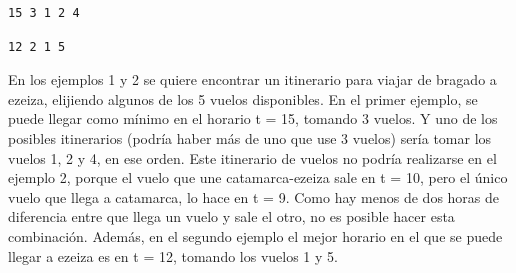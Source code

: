 \documentclass[11pt, a4paper, twoside]{article}
\begin{document}
\begin{minipage}[t]{0.4\textwidth}
\begin{Verbatim}[frame=single,framesep=1cm,label= Salida para instancia 1]
15 3 1 2 4
\end{Verbatim}
\end{minipage}
\hfill
\begin{minipage}[t]{0.4\textwidth}
\begin{Verbatim}[frame=single,framesep=1cm,label= Salida para instancia 2]
12 2 1 5
\end{Verbatim}
\end{minipage}

En los ejemplos 1 y 2 se quiere encontrar un itinerario para viajar de bragado a 
ezeiza, elijiendo algunos de los 5 vuelos disponibles. En el primer ejemplo, se 
puede llegar como mínimo en el horario t = 15, tomando 3 vuelos. Y uno de los
posibles itinerarios (podría haber más de uno que use 3 vuelos) sería tomar los 
vuelos 1, 2 y 4, en ese orden. Este itinerario de vuelos no podría realizarse en
el ejemplo 2, porque el vuelo que une catamarca-ezeiza sale en t = 10, pero el 
único vuelo que llega a catamarca, lo hace en t = 9. Como hay menos de dos horas
de diferencia entre que llega un vuelo y sale el otro, no es posible hacer esta 
combinación. Además, en el segundo ejemplo el mejor horario en el que se puede 
llegar a ezeiza es en t = 12, tomando los vuelos 1 y 5. \\
\end{document}
